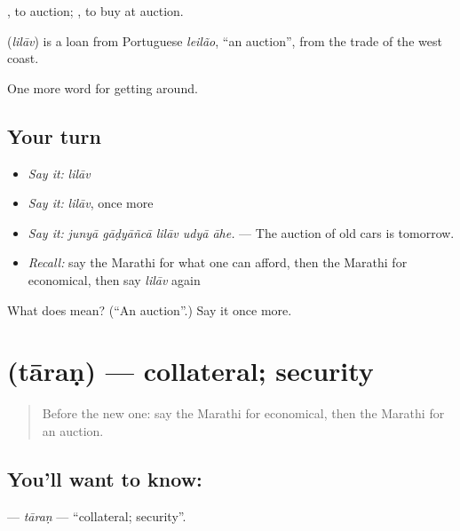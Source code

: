  , to auction;  , to buy at auction.

\begin{cousinweb}
\textbf{} (\emph{lilāv}) is a loan from Portuguese \emph{leilão}, \textquotedblleft{}an auction\textquotedblright{}, from the trade of the west coast.
\end{cousinweb}

\begin{grammarlens}[title={What you've built}]
One more word for getting around.
\end{grammarlens}

\subsection*{Your turn}
\begin{itemize}
\raggedright
  \item \emph{Say it:} \emph{lilāv}
  \item \emph{Say it:} \emph{lilāv}, once more
  \item \emph{Say it:} \emph{junyā gāḍyāñcā lilāv udyā āhe.} — The auction of old cars is tomorrow.
  \item \emph{Recall:} say the Marathi for what one can afford, then the Marathi for economical, then say \emph{lilāv} again
\end{itemize}

\begin{tcolorbox}[breakable,colback=teal!4,colframe=teal!35!black,title={Before you move on}]
What does  mean? (\textquotedblleft{}An auction\textquotedblright{}.) Say it once more.
\end{tcolorbox}
\section[\texorpdfstring{\mr{तारण} (tāraṇ)}{तारण (tāraṇ)}]{ (tāraṇ) — collateral; security}

\label{lesson:MR-C429-taran}



\begin{quote}
Before the new one: say the Marathi for economical, then the Marathi for an auction.
\end{quote}

\subsection*{You'll want to know: }
\textbf{} — \emph{tāraṇ} — \textquotedblleft{}collateral; security\textquotedblright{}.

